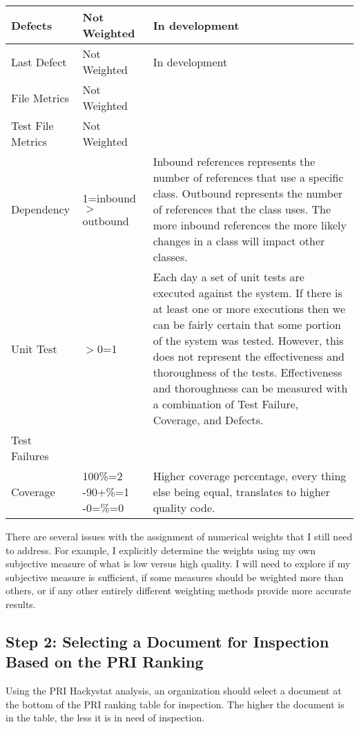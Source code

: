\begin{table}[htbp]
\begin{center}
\begin{tabular}{|p{2.5cm}|p{3.0cm}|p{8.0cm}|}
\small{}Defects & \small{}Not Weighted & \small{}In development \\ \hline
\small{}Last Defect & \small{}Not Weighted & \small{}In development \\ \hline

\small{}File Metrics & \small{}Not Weighted & \small{} \\ \hline
\small{}Test File Metrics & \small{}Not Weighted  & \small{} \\ \hline

\small{}Dependency & \small{}1=inbound$>$outbound & \small{}Inbound
references represents the number of references that use a specific
class. Outbound represents the number of references that the class
uses. The more inbound references the more likely changes in a class will
impact other classes.\\ \hline

\small{}Unit Test & \small{}$>$0=1 & \small{}Each day a set of unit tests
are executed against the system. If there is at least one or more
executions then we can be fairly certain that some portion of the system
was tested. However, this does not represent the effectiveness and
thoroughness of the tests. Effectiveness and thoroughness can be measured
with a combination of Test Failure, Coverage, and Defects.\\ \hline

\small{}Test Failures & \small{} & \small{} \\ \hline

\small{}Coverage & \small{}100\%=2 \newline 99-90+\%=1 \newline 89-0=\%=0 &
\small{}Higher coverage percentage, every thing else being equal,
translates to higher quality code. \\ \hline

    \end{tabular}
  \end{center}
\end{table}


There are several issues with the assignment of numerical weights that I
still need to address. For example, I explicitly determine the weights
using my own subjective measure of what is low versus high quality.  I will
need to explore if my subjective measure is sufficient, if some measures
should be weighted more than others, or if any other entirely different
weighting methods provide more accurate results.

\subsection{Step 2: Selecting a Document for Inspection Based on the PRI
  Ranking} Using the PRI Hackystat analysis, an organization should
select a document at the bottom of the PRI ranking table for inspection.
The higher the document is in the table, the less it is in need of
inspection. 

